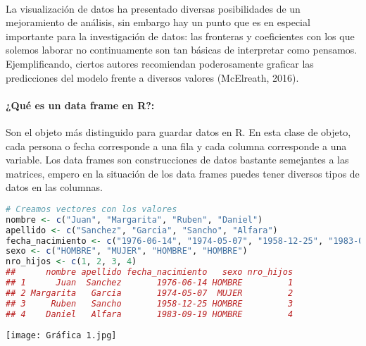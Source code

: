 \documentclass{article}
\begin{document}
\paragraph{}
La visualización de datos ha presentado diversas posibilidades de un mejoramiento de análisis, sin embargo hay un punto que es en especial importante para la investigación de datos: las fronteras y coeficientes con los que solemos laborar no continuamente son tan básicas de interpretar como pensamos. Ejemplificando, ciertos autores recomiendan poderosamente graficar las predicciones del modelo frente a diversos valores (McElreath, 2016).
\paragraph{¿Qué es un data frame en R?:}
Son el objeto más distinguido para guardar datos en R. En esta clase de objeto, cada persona o fecha corresponde a una fila y cada columna corresponde a una variable.
Los data frames son construcciones de datos bastante semejantes a las matrices, empero en la situación de los data frames puedes tener diversos tipos de datos en las columnas. \\

\begin{lstlisting}[language=R]
# Creamos vectores con los valores
nombre <- c("Juan", "Margarita", "Ruben", "Daniel")
apellido <- c("Sanchez", "Garcia", "Sancho", "Alfara")
fecha_nacimiento <- c("1976-06-14", "1974-05-07", "1958-12-25", "1983-09-19")
sexo <- c("HOMBRE", "MUJER", "HOMBRE", "HOMBRE")
nro_hijos <- c(1, 2, 3, 4)
##      nombre apellido fecha_nacimiento   sexo nro_hijos
## 1      Juan  Sanchez       1976-06-14 HOMBRE         1
## 2 Margarita   Garcia       1974-05-07  MUJER         2
## 3     Ruben   Sancho       1958-12-25 HOMBRE         3
## 4    Daniel   Alfara       1983-09-19 HOMBRE         4


\end{lstlisting}
\begin{center}
    \texttt{[image: Gráfica 1.jpg]}
\end{center}
\end{document}
